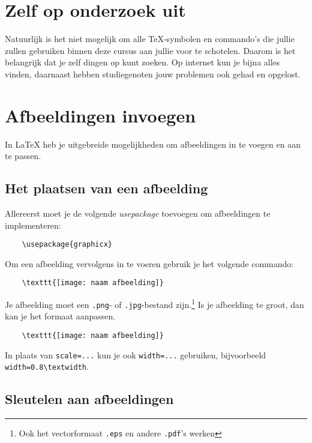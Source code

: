 \section{Zelf op onderzoek uit}
Natuurlijk is het niet mogelijk om alle \TeX-symbolen en commando's die jullie
zullen gebruiken binnen deze cursus aan jullie voor te schotelen. Daarom is het
belangrijk dat je zelf dingen op kunt zoeken. Op internet kun je bijna alles vinden, daarnaast hebben studiegenoten jouw problemen ook gehad en opgelost.

\section{Afbeeldingen invoegen}

In \LaTeX{} heb je uitgebreide mogelijkheden om afbeeldingen in te voegen en aan
te passen.

\subsection{Het plaatsen van een afbeelding}

Allereerst moet je de volgende \emph{usepackage} toevoegen om afbeeldingen te
implementeren:
\begin{verbatim}
    \usepackage{graphicx}
\end{verbatim}
Om een afbeelding vervolgens in te voeren gebruik je het volgende commando:
\begin{verbatim}
    \texttt{[image: naam afbeelding]}
\end{verbatim}
Je afbeelding moet een \verb|.png|- of \verb|.jpg|-bestand zijn.\footnote{Ook het vectorformaat \texttt{.eps} en andere \texttt{.pdf}'s werken}
Is je afbeelding te groot, dan kan je het formaat aanpassen.
\begin{verbatim}
    \texttt{[image: naam afbeelding]}
\end{verbatim}
In plaats van \verb|scale=...| kun je ook \verb|width=...| gebruiken,
bijvoorbeeld \verb|width=0.8\textwidth|.

\subsection{Sleutelen aan afbeeldingen}

